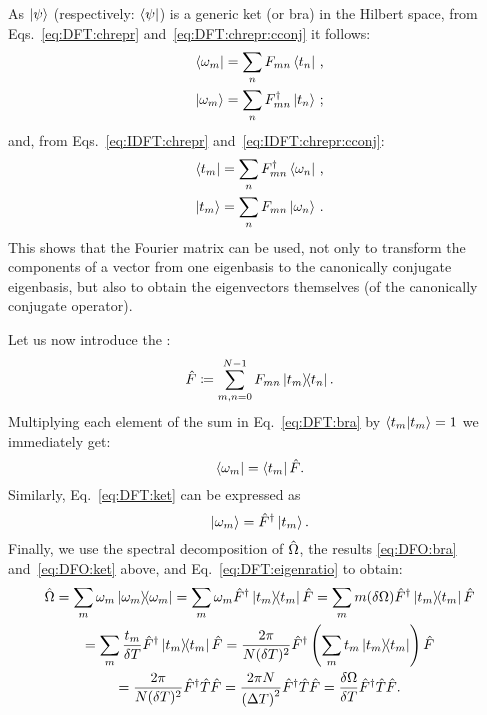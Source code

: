 As $\ket{\psi}$ (respectively: $\bra{\psi}$) is a generic ket (or bra) in the Hilbert space,
from Eqs.~\eqref{eq:DFT:chrepr} and~\eqref{eq:DFT:chrepr:cconj} it follows:
\begin{align}
  \label{eq:DFT:bra}  \bra{\omega_{m}} &= \sum_n F_{mn}           \bra{t_n}       \,\text{,}  \\
  \label{eq:DFT:ket}  \ket{\omega_{m}} &= \sum_n F_{mn}^{\dagger} \ket{t_n}       \,\text{;}
\end{align}
and, from Eqs.~\eqref{eq:IDFT:chrepr} and~\eqref{eq:IDFT:chrepr:cconj}:
\begin{align}
  \label{eq:IDFT:bra} \bra{t_{m}}      &= \sum_n F^{\dagger}_{mn} \bra{\omega_n}  \,\text{,} \\
  \label{eq:IDFT:ket} \ket{t_{m}}      &= \sum_n F_{mn}           \ket{\omega_n}  \,\text{.}
\end{align}
This shows that the Fourier matrix can be used, not only to transform the components
of a vector from one eigenbasis to the canonically conjugate eigenbasis,
but also to obtain the eigenvectors themselves (of the canonically conjugate operator).

Let us now introduce the : %
\begin{equation}\label{eq:pw:def_fourier_op}
  \hat{F} \coloneqq \sum_{m,n=0}^{N-1} F_{mn} \ketbra{t_m}{t_n} \text{.}
\end{equation}
Multiplying each element of the sum in Eq.~\eqref{eq:DFT:bra}
by $\braket{t_m} = 1$
we immediately get:
\begin{equation}\label{eq:DFO:bra}
  \bra{\omega_{m}} =
  \bra{t_m} \hat{F} \text{.}
\end{equation}
Similarly, Eq.~\eqref{eq:DFT:ket} can be expressed as
\begin{equation}
  \label{eq:DFO:ket}  \ket{\omega_{m}} = \hat{F}^{\dagger} \ket{t_m} \text{.}
\end{equation}
%
Finally, we use the spectral decomposition of $\hat{\Omega}$,
the results \eqref{eq:DFO:bra} and~\eqref{eq:DFO:ket} above,
and Eq.~\eqref{eq:DFT:eigenratio}
to obtain:
\begin{multline}\label{eq:DFT:OmegaFTF}
  \hat{\Omega} = \sum_{m} \omega_{m} \ketbra{\omega_{m}} =
  \sum_{m} \omega_{m} \hat{F}^{\dagger} \ketbra{t_{m}} \hat{F} =
  \sum_{m} m \qty(\delta\Omega) \hat{F}^{\dagger} \ketbra{t_{m}} \hat{F}
  \\
  = \sum_{m} \frac{t_m}{\delta{T}} \hat{F}^{\dagger} \ketbra{t_{m}} \hat{F}
  = \frac{2\pi}{N(\delta{T})^{2}} \hat{F}^{\dagger} \left(\sum_{m}t_{m}\ketbra{t_{m}}\right) \hat{F}
  \\
  =
  \frac{2\pi}{N(\delta{T})^{2}} \hat{F}^{\dagger} \hat{T} \hat{F} =
  \frac{2\pi N}{\qty(\Delta T)^2} \hat{F}^{\dagger} \hat{T} \hat{F} = \frac{\delta\Omega}{\delta{T}} \hat{F}^{\dagger} \hat{T} \hat{F}
  \text{.}
\end{multline}

